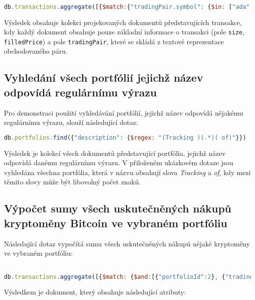 \documentclass[12pt, a4paper]{article}
\begin{document}
\begin{lstlisting}[language=JavaScript]

db.transactions.aggregate([{$match:{"tradingPair.symbol": {$in: ["ada", "dot"]}}}, {$project: {"size": 1, "filledPrice": 1, "tradingPair": {$concat:["$tradingPair.symbol", "/", "$tradingPair.currency"]}}}])

\end{lstlisting}

Výsledek obsahuje kolekci projekovaných dokumentů představujících transakce, kdy každý dokument obsahuje pouze základní informace o transakci (pole \texttt{size}, \texttt{filledPrice}) a pole \texttt{tradingPair}, které se skládá z textové reprezentace obchodovaného páru.


\subsection{Vyhledání všech portfólií jejichž název odpovídá regulárnímu výrazu}
Pro demonstraci použití vyhledávání portfólií, jejichž název odpovídá nějakému regulárnímu výrazu, slouží následující dotaz:

\begin{lstlisting}[language=JavaScript]
db.portfolios.find({"description": {$regex: "(Tracking )(.*)( of)"}})
\end{lstlisting}

Výsledek je kolekcí všech dokumentů představující portfólia, jejichž název odpovídá danému regulárnímu výrazu. V přiloženém ukázkovém dotaze jsou vyhledána všechna portfólia, která v názvu obsahují slova \textit{Tracking} a \textit{of}, kdy mezi těmito slovy může být libovolný počet znaků.

\subsection{Výpočet sumy všech uskutečněných nákupů kryptoměny Bitcoin ve vybraném portfóliu}
Následující dotaz vypočítá sumu všech uskutečněných nákupů nějaké kryptoměny ve vybraném portfóliu:

\begin{lstlisting}[language=JavaScript]

db.transactions.aggregate([{$match: {$and:[{"portfolioId":2}, {"tradingPair.symbol": "btc"}, {"sell": {$exists: false}}]}}, {$group: {_id: "$tradingPair.symbol", sum: {$sum: "$size"}}}])

\end{lstlisting}
Výsledkem je dokument, který obsahuje následující atributy: 
\end{document}
